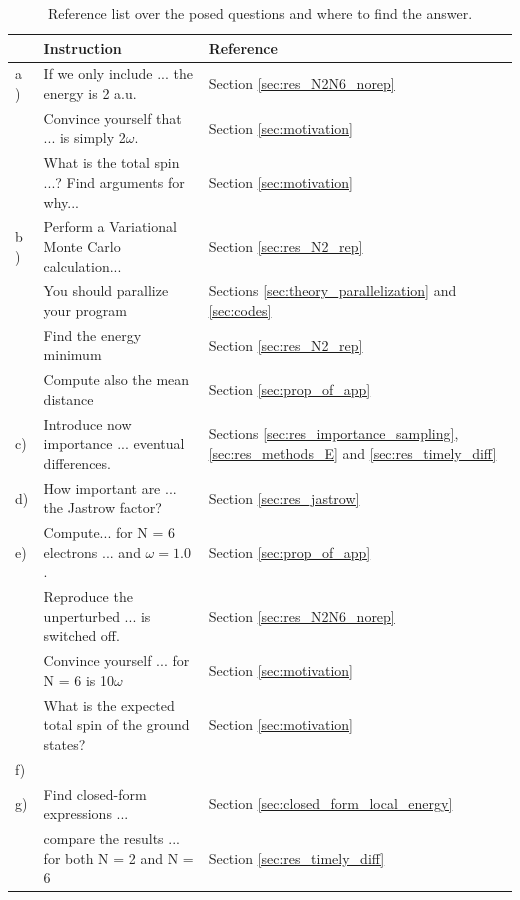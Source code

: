 \documentclass[a4paper,10pt,english]{article}
\numberwithin{figure}{subsection}
\numberwithin{table}{subsection}
\numberwithin{equation}{subsection}
\begin{document}
\begin{appendices}
\begin{table}[h!]
        \begin{tabular}{lll}
        \toprule
                        & Instruction           & Reference \\
        \midrule
        a )             & If we only include ... the energy is 2 a.u. & Section \ref{sec:res_N2N6_norep} \\
                        & Convince yourself that ... is simply 2$\omega$. & Section \ref{sec:motivation} \\
                        & What is the total spin ...? Find arguments for why... & Section \ref{sec:motivation} \\
        \midrule
        b )             & Perform a Variational Monte Carlo calculation...    & Section \ref{sec:res_N2_rep}\\
                        & You should parallize your program         & Sections \ref{sec:theory_parallelization} and \ref{sec:codes} \\
                        & Find the energy minimum           & Section \ref{sec:res_N2_rep} \\
                        & Compute also the mean distance    & Section \ref{sec:prop_of_app} \\
        \midrule
        c)            & Introduce now importance ... eventual differences. & Sections \ref{sec:res_importance_sampling}, \ref{sec:res_methods_E} and \ref{sec:res_timely_diff}\\
        \midrule 
        d)  &  How important are ... the Jastrow factor? & Section \ref{sec:res_jastrow}\\
        \midrule
        e) & Compute...  for N = 6 electrons ...  and $\omega = 1.0$. & Section \ref{sec:prop_of_app} \\ 
         &  Reproduce the unperturbed ... is switched off.  & Section \ref{sec:res_N2N6_norep} \\
         &      Convince yourself ... for N = 6 is 10$\omega$ & Section \ref{sec:motivation} \\
         & What is the expected total spin of the ground states? & Section \ref{sec:motivation} \\

        \midrule 
        f) \\
        \midrule
        g) &  Find closed-form expressions ... & Section \ref{sec:closed_form_local_energy} \\
           & compare the results ... for both N = 2 and N = 6 & Section \ref{sec:res_timely_diff} \\
        \bottomrule
        \end{tabular}
        \caption{Reference list over the posed questions and where to find the answer.}
\end{table}




\end{appendices}
\end{document}
